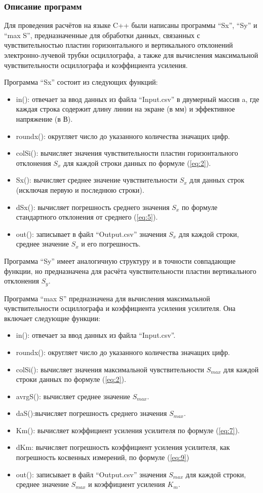 \subsubsection{Описание программ}

Для проведения расчётов на языке C++ были написаны программы ``Sx'', ``Sy'' и ``max S'', предназначенные для обработки данных, связанных с чувствительностью пластин горизонтального и вертикального отклонений электронно-лучевой трубки осциллографа, а также для вычисления максимальной чувствительности осциллографа и коэффициента усиления.

Программа ``Sx'' состоит из следующих функций:
\begin{itemize}
\item in(): отвечает за ввод данных из файла ``Input.csv'' в двумерный массив a, где каждая строка содержит длину линии на экране (в мм) и эффективное напряжение (в В).
\item roundx(): округляет число до указанного количества значащих цифр.
\item colSi(): вычисляет значения чувствительности пластин горизонтального отклонения $S_x$ для каждой строки данных по формуле (\ref{eq:2}).
\item Sx(): вычисляет среднее значение чувствительности $S_x$ для данных строк (исключая первую и последнюю строки).
\item dSx(): вычисляет погрешность среднего значения $S_x$ по формуле стандартного отклонения от среднего (\ref{eq:5}).
\item out(): записывает в файл ``Output.csv'' значения $S_x$ для каждой строки, среднее значение $S_x$ и его погрешность.
\end{itemize}

Программа ``Sy'' имеет аналогичную структуру и в точности совпадающие функции, но предназначена для расчёта чувствительности пластин вертикального отклонения $S_y$.

Программа ``max S'' предназначена для вычисления максимальной чувствительности осциллографа и коэффициента усиления усилителя. Она включает следующие функции:

\begin{itemize}
\item in(): отвечает за ввод данных из файла ``Input.csv''.
\item roundx(): округляет число до указанного количества значащих цифр.
\item colSi(): вычисляет значения максимальной чувствительности $S_{max}$ для каждой строки данных по формуле (\ref{eq:2}).
\item avrgS(): вычисляет среднее значение $S_{max}$.
\item daS():вычисляет погрешность среднего значения $S_{max}$.
\item Km(): вычисляет коэффициент усиления усилителя по формуле (\ref{eq:7}).
\item dKm: вычисляет погрешность коэффициент усиления усилителя, как погрешность косвенных измерений, по формуле (\ref{eq:9})
\item out(): записывает в файл ``Output.csv'' значения $S_{max}$ для каждой строки, среднее значение $S_{max}$ и коэффициент усиления $K_m$.
\end{itemize}

